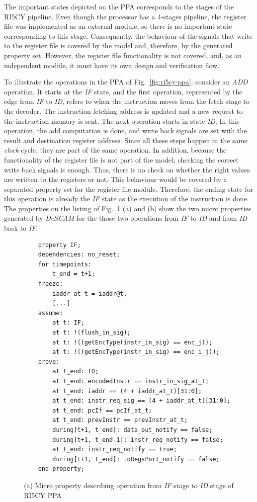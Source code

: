 The important states depicted on the PPA corresponds to the stages of the RI5CY pipeline. Even though the processor has a 4-stages pipeline, the register file was implemented as an external module, so there is no important state corresponding to this stage. Consequently, the behaviour of the signals that write to the register file is covered by the model and, therefore, by the generated property set. However, the register file functionality is not covered, and, as an independent module, it must have its own design and verification flow.

To illustrate the operations in the PPA of Fig.~\ref{fig:ri5cy-ppa}, consider an \textit{ADD} operation. It starts at the \textit{IF} state, and the first operation, represented by the edge from \textit{IF} to \textit{ID}, refers to when the instruction moves from the fetch stage to the decoder. The instruction fetching address is updated and a new request to the instruction memory is sent. The next operation starts in state \textit{ID}. In this operation, the add computation is done, and write back signals are set with the result and destination register address. Since all these steps happen in the same \textit{clock} cycle, they are part of the same operation. In addition, because the functionality of the register file is not part of the model, checking the correct write back signals is enough. Thus, there is no check on whether the right values are written to the registers or not. This behaviour would be covered by a separated property set for the register file module. Therefore, the ending state for this operation is already the \textit{IF} state as the execution of the instruction is done. The properties on the listing of Fig.~\ref{fig:ri5cy-if-id-micro-ppt-a} (a) and (b) show the two micro properties generated by \textit{DeSCAM} for the those two operations from \textit{IF} to \textit{ID} and from \textit{ID} back to \textit{IF}.

\begin{figure}[htb]
    \begin{lstlisting}
    property IF;
    dependencies: no_reset;
    for timepoints:
        t_end = t+1;
    freeze:
        iaddr_at_t = iaddr@t,
        [...]
    assume:
        at t: IF;
        at t: !(flush_in_sig);
        at t: !((getEncType(instr_in_sig) == enc_j));
        at t: !((getEncType(instr_in_sig) == enc_i_j));
    prove:
        at t_end: ID;
        at t_end: encodedInstr == instr_in_sig_at_t;
        at t_end: iaddr == (4 + iaddr_at_t)[31:0];
        at t_end: instr_req_sig == (4 + iaddr_at_t)[31:0];
        at t_end: pcIf == pcIf_at_t;
        at t_end: prevInstr == prevInstr_at_t;
        during[t+1, t_end]: data_out_notify == false;
        during[t+1, t_end-1]: instr_req_notify == false;
        at t_end: instr_req_notify == true;
        during[t+1, t_end]: toRegsPort_notify == false;
    end property;\end{lstlisting}
    \caption{(a) Micro property describing operation from \textit{IF} stage to \textit{ID} stage of RI5CY PPA}
    \label{fig:ri5cy-if-id-micro-ppt-a}
\end{figure}

